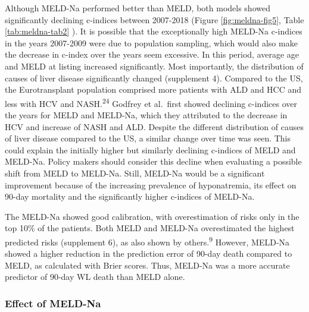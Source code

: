 \documentclass[11pt,english,]{book} %
\begin{document}
Although MELD-Na performed better than MELD, both models showed significantly declining c-indices between 2007-2018 (Figure \ref{fig:meldna-fig5}, Table \ref{tab:meldna-tab2} ). It is possible that the exceptionally high MELD-Na c-indices in the years 2007-2009 were due to population sampling, which would also make the decrease in c-index over the years seem excessive. In this period, average age and MELD at listing increased significantly. Most importantly, the distribution of causes of liver disease significantly changed (supplement 4). Compared to the US, the Eurotransplant population comprised more patients with ALD and HCC and less with HCV and NASH.\textsuperscript{24} Godfrey et al.~first showed declining c-indices over the years for MELD and MELD-Na, which they attributed to the decrease in HCV and increase of NASH and ALD. Despite the different distribution of causes of liver disease compared to the US, a similar change over time was seen. This could explain the initially higher but similarly declining c-indices of MELD and MELD-Na. Policy makers should consider this decline when evaluating a possible shift from MELD to MELD-Na. Still, MELD-Na would be a significant improvement because of the increasing prevalence of hyponatremia, its effect on 90-day mortality and the significantly higher c-indices of MELD-Na.

The MELD-Na showed good calibration, with overestimation of risks only in the top 10\% of the patients. Both MELD and MELD-Na overestimated the highest predicted risks (supplement 6), as also shown by others.\textsuperscript{9} However, MELD-Na showed a higher reduction in the prediction error of 90-day death compared to MELD, as calculated with Brier scores. Thus, MELD-Na was a more accurate predictor of 90-day WL death than MELD alone.

\hypertarget{effect-of-meld-na}{%
\subsubsection*{Effect of MELD-Na}\label{effect-of-meld-na}}
\end{document}
